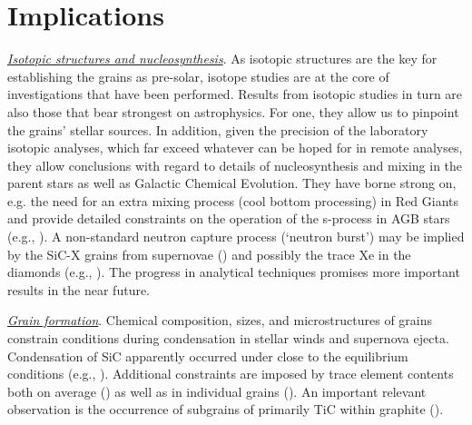 \documentclass{iau}
\begin{document}
\section{Implications}

{\underline{\it Isotopic structures and nucleosynthesis}}. As isotopic structures are the key for
establishing the grains as pre-solar, isotope studies are at the core of investigations that have
been performed. Results from isotopic studies in turn are also those that bear strongest on
astrophysics. For one, they allow us to pinpoint the grains' stellar sources. In addition, given the
precision of the laboratory isotopic analyses, which far exceed whatever can be hoped for in
remote analyses, they allow conclusions with regard to details of nucleosynthesis and mixing
in the parent stars as well as Galactic Chemical Evolution. They have borne strong on, e.g. the
need for an extra mixing process (cool bottom processing) in Red Giants and provide detailed
constraints on the operation of the s-process in AGB stars (e.g., 
\cite[Busso et al. 1999]{Busso_etal99}). 
A non-standard neutron capture process (`neutron burst') may be implied by the SiC-X grains from supernovae 
(\cite[Meyer et al. 2000]{Meyer_etal00}) and possibly the trace Xe in the diamonds (e.g., 
\cite[Ott 2002]{Ott02}).
The progress in analytical techniques promises more important results in the near future.

{\underline{\it Grain formation}}. Chemical composition, sizes, and microstructures of grains constrain
conditions during condensation in stellar winds and supernova ejecta. Condensation of SiC
apparently occurred under close to the equilibrium conditions (e.g., 
\cite[Lodders \& Fegley 1998]{LoddersFegley98}).
Additional constraints are imposed by trace element contents both on average 
(\cite[Yin et al. 2006]{Yin_etal06}) 
as well as in individual grains 
(\cite[Amari et al. 1995]{Amari_etal95}). 
An important relevant observation is
the occurrence of subgrains of primarily TiC within graphite 
(\cite[Croat et al. 2005]{Croat_etal05}).
\end{document}
